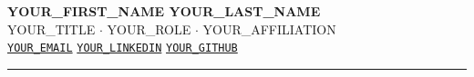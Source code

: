 \documentclass[11pt,a4paper]{article}
\begin{document}
\begin{minipage}[c]{0.76\textwidth}
  {\LARGE\bfseries\sffamily YOUR_FIRST_NAME YOUR_LAST_NAME}\\[3pt]
  {\normalsize\sffamily
    YOUR_TITLE \textcolor{Marker}{$\cdot$}
    YOUR_ROLE \textcolor{Marker}{$\cdot$}
    YOUR_AFFILIATION%
  }\\[4pt]
  {\small
    \makebox[1.1em]{\color{Marker!80!black}\faEnvelope[regular]}
    \href{mailto:YOUR_EMAIL}{\texttt{YOUR_EMAIL}}\enspace
    \makebox[1.1em]{\color{Marker!80!black}\faLinkedin}
    \href{https://linkedin.com/in/YOUR_LINKEDIN}{\texttt{YOUR_LINKEDIN}}\enspace
    \makebox[1.1em]{\color{Marker!80!black}\faGithub}
    \href{https://github.com/YOUR_GITHUB}{\texttt{YOUR\_GITHUB}}\\
  }
\end{minipage}\hfill
\begin{minipage}[c]{0.22\textwidth}
  \raggedleft
\end{minipage}

\vspace{4pt}
{\color{SwishLine}\rule{\linewidth}{1.5pt}}
\end{document}
